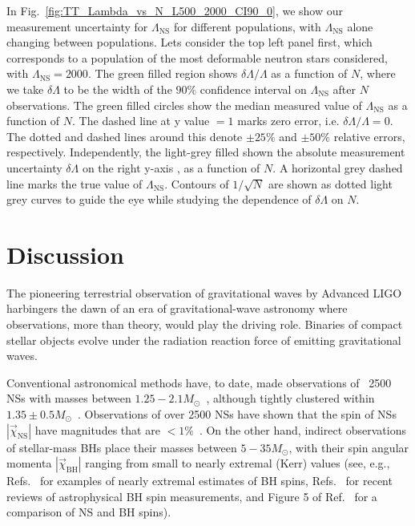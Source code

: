 \documentclass[aps,prd,amsmath,floats,floatfix, twocolumn,
superscriptaddress,nofootinbib,showpacs]{revtex4-1}
\newcommand{\lambdans}{\Lambda_\mathrm{NS}}
\begin{document}
In Fig.~\ref{fig:TT_Lambda_vs_N_L500_2000_CI90_0}, we show our measurement 
uncertainty for $\lambdans$ for different populations, with $\lambdans$ alone
changing between populations. Lets consider the top left panel first, which
corresponds to a population of the most deformable neutron stars considered,
with $\lambdans=2000$. The green filled region shows $\delta\Lambda/\Lambda$
as a function of $N$, where we take $\delta\Lambda$ to be the width of the 
$90\%$ confidence interval on $\lambdans$ after $N$ observations.
%
The green filled circles show the median measured value of $\lambdans$
as a function of $N$. The dashed line at y value $=1$ marks zero error, i.e.
$\delta\Lambda/\Lambda=0$. The dotted and dashed lines around this denote
$\pm 25\%$ and $\pm 50\%$ relative errors, respectively. Independently, the
light-grey filled shown the absolute measurement uncertainty $\delta\Lambda$
on the right y-axis , as a function of $N$. A horizontal grey dashed line
marks the true value of $\lambdans$. Contours of $1/\sqrt{N}$ are shown as 
dotted light grey curves to guide the eye while studying the dependence of
$\delta\Lambda$ on $N$.
% 







\section{Discussion}\label{s1:discussion}


The pioneering terrestrial observation of gravitational waves by Advanced LIGO
harbingers the dawn of an era of gravitational-wave astronomy where 
observations, more than theory, would play the driving role. Binaries of 
compact stellar objects evolve under the radiation reaction force of emitting
gravitational waves.


Conventional astronomical methods have, to date, made observations of ~2500
NSs with masses between $1.25-2.1 M_\odot$~\cite{Lyne:2004cj,
Demorest:2010bx,2013Sci...340..448A,atnfcatalog,mcgillmagnetarcatalog,
stellarcollapsemass}, although
tightly clustered within $1.35\pm0.5M_\odot$~\cite{stellarcollapsemass}.
%
Observations of over 2500 NSs have shown that the spin of NSs
$|\vec{\chi}_\mathrm{NS}|$ have magnitudes that are $<1\%$~\cite{Miller:2014aaa}.
%
On the other hand, indirect observations of stellar-mass BHs place their
masses between $5-35M_\odot$, with their spin angular momenta 
$|\vec{\chi}_\mathrm{BH}|$ ranging from small to nearly extremal (Kerr) values
(see, e.g., Refs.~\cite{McClintockEtAl:2006,Miller:2009cw,Gou:2014una} for 
examples of nearly extremal estimates of BH spins, Refs.~\cite{McClintock:2013vwa,
Reynolds:2013qqa} for recent reviews of astrophysical BH spin measurements,
and Figure 5 of Ref.~\cite{Miller:2014aaa} for a comparison of NS and BH spins).
\end{document}
